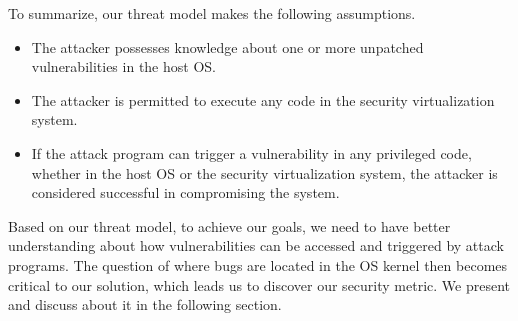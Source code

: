 To summarize, our threat model makes the following assumptions.

\begin{itemize}\setlength\itemsep{0em}

\item The attacker possesses knowledge about one or more unpatched vulnerabilities in the host OS.

\item The attacker is permitted to execute any code in the security virtualization system.

\item If the attack program can trigger a vulnerability in any privileged code,
whether in the host OS or the security virtualization system, the attacker is considered successful in 
compromising the system.

\end{itemize}

Based on our threat model, to achieve our goals, we need to have better understanding about how vulnerabilities can be accessed 
and triggered by attack programs. The question of where bugs are located in the OS kernel then becomes critical to our solution, 
which leads us to discover our security metric. We present and discuss about it in the following section. 
